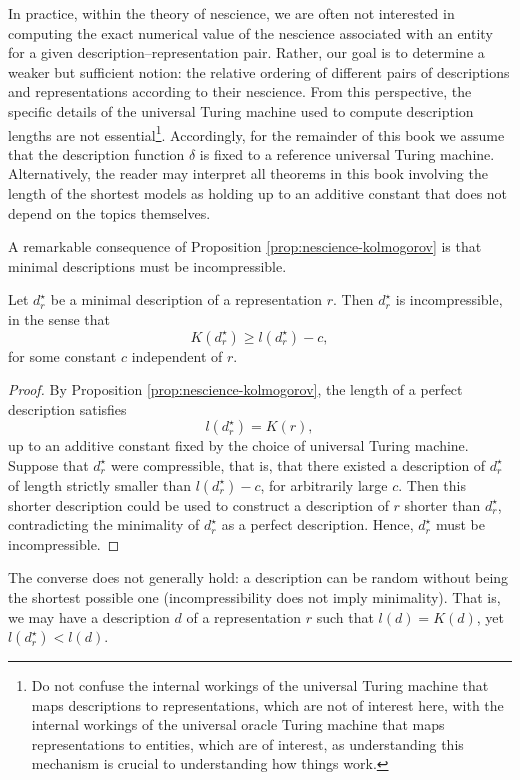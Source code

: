 In practice, within the theory of nescience, we are often not interested in computing the exact numerical value of the nescience associated with an entity for a given description–representation pair. Rather, our goal is to determine a weaker but sufficient notion: the relative ordering of different pairs of descriptions and representations according to their nescience. From this perspective, the specific details of the universal Turing machine used to compute description lengths are not essential\footnote{Do not confuse the internal workings of the universal Turing machine that maps descriptions to representations, which are not of interest here, with the internal workings of the universal oracle Turing machine that maps representations to entities, which are of interest, as understanding this mechanism is crucial to understanding how things work.}. Accordingly, for the remainder of this book we assume that the description function $\delta$ is fixed to a reference universal Turing machine. Alternatively, the reader may interpret all theorems in this book involving the length of the shortest models as holding up to an additive constant that does not depend on the topics themselves.

A remarkable consequence of Proposition \ref{prop:nescience-kolmogorov} is that minimal descriptions must be incompressible.

\begin{corollary}
Let $d_r^{\star}$ be a minimal description of a representation $r$. Then $d_r^{\star}$ is incompressible, in the sense that
\[
K\!\left(d_r^{\star}\right) \geq l\!\left(d_r^{\star}\right) - c,
\]
for some constant $c$ independent of $r$.
\end{corollary}
\begin{proof}
By Proposition \ref{prop:nescience-kolmogorov}, the length of a perfect description satisfies
\[
l\!\left(d_r^{\star}\right) = K(r),
\]
up to an additive constant fixed by the choice of universal Turing machine. Suppose that $d_r^{\star}$ were compressible, that is, that there existed a description of $d_r^{\star}$ of length strictly smaller than $l(d_r^{\star}) - c$, for arbitrarily large $c$. Then this shorter description could be used to construct a description of $r$ shorter than $d_r^{\star}$, contradicting the minimality of $d_r^{\star}$ as a perfect description. Hence, $d_r^{\star}$ must be incompressible.
\end{proof}

The converse does not generally hold: a description can be random without being the shortest possible one (incompressibility does not imply minimality). That is, we may have a description $d$ of a representation $r$ such that $l(d) = K(d)$, yet $l(d_r^{\star}) < l(d)$.


